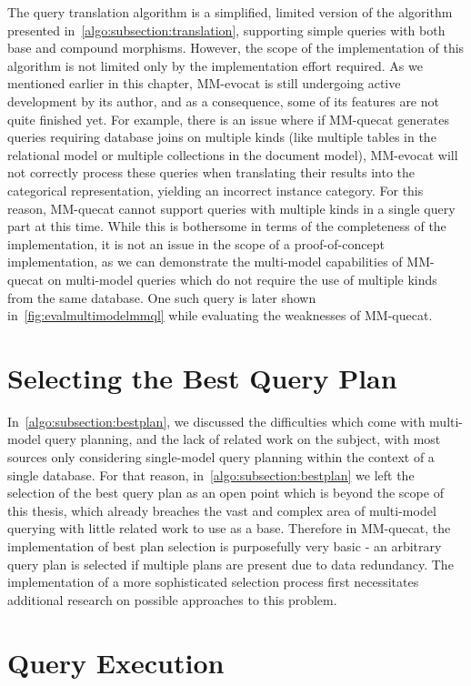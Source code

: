 The query translation algorithm is a simplified, limited version of the algorithm presented in~\cref{algo:subsection:translation}, supporting simple queries with both base and compound morphisms.
However, the scope of the implementation of this algorithm is not limited only by the implementation effort required.
As we mentioned earlier in this chapter, MM-evocat is still undergoing active development by its author, and as a consequence, some of its features are not quite finished yet.
For example, there is an issue where if MM-quecat generates queries requiring database joins on multiple kinds (like multiple tables in the relational model or multiple collections in the document model), MM-evocat will not correctly process these queries when translating their results into the categorical representation, yielding an incorrect instance category.
For this reason, MM-quecat cannot support queries with multiple kinds in a single query part at this time.
While this is bothersome in terms of the completeness of the implementation, it is not an issue in the scope of a proof-of-concept implementation, as we can demonstrate the multi-model capabilities of MM-quecat on multi-model queries which do not require the use of multiple kinds from the same database.
One such query is later shown in~\cref{fig:evalmultimodelmmql} while evaluating the weaknesses of MM-quecat.

\section{Selecting the Best Query Plan}

In~\cref{algo:subsection:bestplan}, we discussed the difficulties which come with multi-model query planning, and the lack of related work on the subject, with most sources only considering single-model query planning within the context of a single database.
For that reason, in~\cref{algo:subsection:bestplan} we left the selection of the best query plan as an open point which is beyond the scope of this thesis, which already breaches the vast and complex area of multi-model querying with little related work to use as a base.
Therefore in MM-quecat, the implementation of best plan selection is purposefully very basic - an arbitrary query plan is selected if multiple plans are present due to data redundancy.
The implementation of a more sophisticated selection process first necessitates additional research on possible approaches to this problem.

\section{Query Execution}

